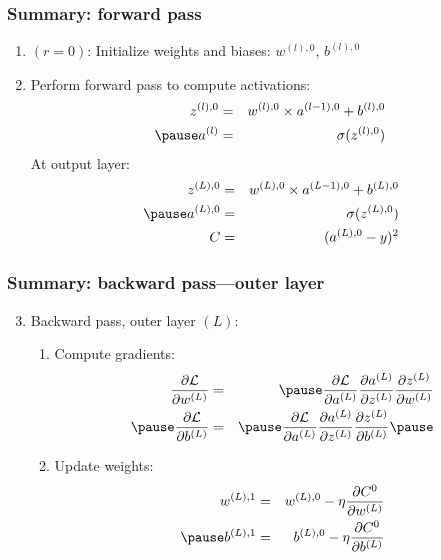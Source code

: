\documentclass[smaller]{beamer}
\begin{document}
\begin{frame}
  \frametitle{Summary: forward pass}
  \begin{enumerate}[<+->]
  \item $(r=0)$: Initialize weights and biases: $w^{(l),0}$, $b^{(l),0}$
  \item Perform forward pass to compute activations:
    \begin{eqnarray}
      z^{(l),0} &=& w^{(l),0} \times a^{(l-1),0} + b^{(l),0} \\\pause
    a^{(l)} &=& \sigma(z^{(l),0}) 
    \end{eqnarray}
    \pause
    At output layer:
    \begin{eqnarray}      
      z^{(L),0} &=& w^{(L),0} \times a^{(L-1),0} + b^{(L),0} \\\pause
      a^{(L),0} &=& \sigma(z^{(L),0}) \\
      C &=& (a^{(L),0}  - y)^2
    \end{eqnarray}
  \end{enumerate}
\end{frame}

\begin{frame}
  \frametitle{Summary: backward pass---outer layer }
  \begin{enumerate}[<+->]\setcounter{enumi}{2}
  \item Backward pass, outer layer $(L)$:\pause
    \begin{enumerate}[<+->]
    \item Compute gradients: \pause
      \begin{eqnarray}
      \pd{\mc{L}}{w^{(L)}} &=& \pause \pd{\mc{L}}{a^{(L)}}\pd{a^{(L)}}{z^{(L)}}\pd{z^{(L)}}{w^{(L)}}\\\pause
      \pd{\mc{L}}{b^{(L)}} &=& \pause \pd{\mc{L}}{a^{(L)}}\pd{a^{(L)}}{z^{(L)}}\pd{z^{(L)}}{b^{(L)}}\pause
      \end{eqnarray}
    \item Update weights: \pause
      \begin{eqnarray}
        w^{(L), 1}  &=&  w^{(L),0} - \eta \pd{C^0}{w^{(L)}}  \\\pause
      b^{(L), 1}  &=&  b^{(L),0} - \eta \pd{C^0}{b^{(L)}}  
      \end{eqnarray}
  \end{enumerate}
  \end{enumerate}
\end{frame}
\end{document}
